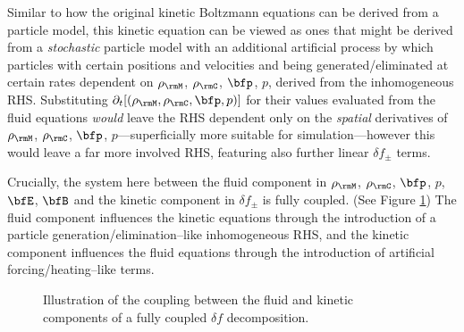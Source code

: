         Similar to how the original kinetic Boltzmann equations can be derived from a particle model, this kinetic equation can be viewed as ones that might be derived from a \emph{stochastic} particle model with an additional artificial process by which particles with certain positions and velocities and being generated/eliminated at certain rates dependent on $\rho_{\rmM}$, $\rho_{\rmC}$, $\bfp$, $p$, derived from the inhomogeneous RHS. Substituting $\partial_{t}[(\rho_{\rmM}, \rho_{\rmC}, \bfp, p)]$ for their values evaluated from the fluid equations \emph{would} leave the RHS dependent only on the \emph{spatial} derivatives of $\rho_{\rmM}$, $\rho_{\rmC}$, $\bfp$, $p$---superficially more suitable for simulation---however this would leave a far more involved RHS, featuring also further linear $\delta\!f_{\pm}$ terms.

    \line

    Crucially, the system here between the fluid component in $\rho_{\rmM}$, $\rho_{\rmC}$, $\bfp$, $p$, $\bfE$, $\bfB$ and the kinetic component in $\delta\!f_{\pm}$ is fully coupled. (See Figure \ref{fig:delta f coupling}) The fluid component influences the kinetic equations through the introduction of a particle generation/elimination--like inhomogeneous RHS, and the kinetic component influences the fluid equations through the introduction of artificial forcing/heating--like terms.

    \begin{figure}[!ht]
        \centering
        \caption{Illustration of the coupling between the fluid and kinetic components of a fully coupled $\delta\!f$ decomposition.}
        \label{fig:delta f coupling}
    \end{figure}
    
